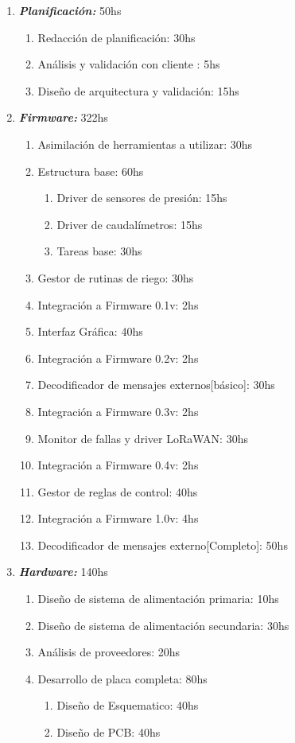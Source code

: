 \documentclass[11pt]{charter}
\begin{document}
\begin{enumerate}
	\item \textbf{ \textit{Planificación:}} 50hs
	\begin{enumerate}
		\item Redacción de planificación: 30hs 
		\item Análisis y validación con cliente : 5hs
		\item Diseño de arquitectura y validación: 15hs
	\end{enumerate}
	
	 \item \textbf{\textit{Firmware:}} 322hs
	 \begin{enumerate}
	 	\item Asimilación de herramientas a utilizar: 30hs
	 	\item Estructura base: 60hs
	 	\begin{enumerate}
	 		\item Driver de sensores de presión: 15hs
	 		\item Driver de caudalímetros: 15hs
	 		\item Tareas base: 30hs
	 	\end{enumerate}
	 	\item Gestor de rutinas de riego: 30hs
	 	\item Integración a Firmware 0.1v: 2hs
	 	\item Interfaz Gráfica: 40hs
	 	\item Integración a Firmware 0.2v: 2hs
	 	\item Decodificador de mensajes externos[básico]: 30hs
	 	\item Integración a Firmware 0.3v: 2hs
	 	\item Monitor de fallas y driver LoRaWAN: 30hs
	 	\item Integración a Firmware 0.4v: 2hs
	 	\item Gestor de reglas de control: 40hs
	 	\item Integración a Firmware 1.0v: 4hs
	 	\item Decodificador de mensajes externo[Completo]: 50hs
	 \end{enumerate}
	 
	 \item \textbf{\textit{Hardware:}} 140hs
	 \begin{enumerate}
	 	\item Diseño de sistema de alimentación primaria: 10hs
	 	\item Diseño de sistema de alimentación secundaria: 30hs
	 	\item Análisis de proveedores: 20hs
	 	\item Desarrollo de placa completa: 80hs
	 	\begin{enumerate}
	 		\item Diseño de Esquematico: 40hs
	 		\item Diseño de PCB: 40hs
	 	\end{enumerate}
	 \end{enumerate}
	 	

\end{enumerate}
\end{document}
